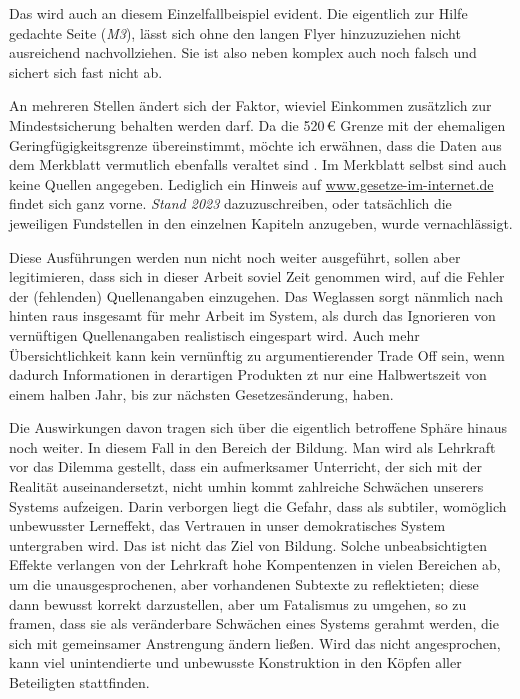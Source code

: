 Das wird auch an diesem Einzelfallbeispiel evident. Die eigentlich zur Hilfe gedachte Seite (\emph{M3}), lässt sich ohne den langen Flyer hinzuzuziehen nicht ausreichend nachvollziehen. Sie ist also neben komplex auch noch falsch und sichert sich fast nicht ab. 


An mehreren Stellen ändert sich der Faktor, wieviel Einkommen zusätzlich zur Mindestsicherung behalten werden darf. 
Da die 520\,€ Grenze mit der ehemaligen Geringfügigkeitsgrenze übereinstimmt, möchte ich erwähnen, dass die Daten aus dem Merkblatt vermutlich ebenfalls veraltet sind \autocite[59-62]{MerkblattSGBII}. 
Im Merkblatt selbst sind auch keine Quellen angegeben. %
Lediglich ein Hinweis auf \url{www.gesetze-im-internet.de} findet sich ganz vorne. \emph{Stand 2023} dazuzuschreiben, oder tatsächlich die jeweiligen Fundstellen in den einzelnen Kapiteln anzugeben, wurde vernachlässigt. %

Diese Ausführungen werden nun nicht noch weiter ausgeführt, sollen aber legitimieren, dass sich in dieser Arbeit soviel Zeit genommen wird, auf die Fehler der (fehlenden) Quellenangaben einzugehen. Das Weglassen sorgt nänmlich nach hinten raus insgesamt für mehr Arbeit im System, als durch das Ignorieren von vernüftigen Quellenangaben realistisch eingespart wird. Auch mehr Übersichtlichkeit kann kein vernünftig zu argumentierender Trade Off sein, wenn dadurch Informationen in derartigen Produkten \gls{zt} nur eine Halbwertszeit von einem halben Jahr, bis zur nächsten Gesetzesänderung, haben.
\bigskip

Die Auswirkungen davon tragen sich über die eigentlich betroffene Sphäre hinaus noch weiter. In diesem Fall in den Bereich der Bildung. Man wird als Lehrkraft vor das Dilemma gestellt, dass ein aufmerksamer Unterricht, der sich mit der Realität auseinandersetzt, nicht umhin kommt zahlreiche Schwächen unserers Systems aufzeigen. Darin verborgen liegt die Gefahr, dass als subtiler, womöglich unbewusster Lerneffekt, das Vertrauen in unser demokratisches System untergraben wird. Das ist nicht das Ziel von Bildung. 
Solche unbeabsichtigten Effekte verlangen von der Lehrkraft hohe Kompentenzen in vielen Bereichen ab, um die unausgesprochenen, aber vorhandenen Subtexte zu reflektieten; diese dann bewusst korrekt darzustellen, aber um Fatalismus zu umgehen, so zu framen, dass sie als veränderbare Schwächen eines Systems gerahmt werden, die sich mit gemeinsamer Anstrengung ändern ließen. Wird das nicht angesprochen, kann viel unintendierte und unbewusste Konstruktion in den Köpfen aller Beteiligten stattfinden. 
\bigskip

